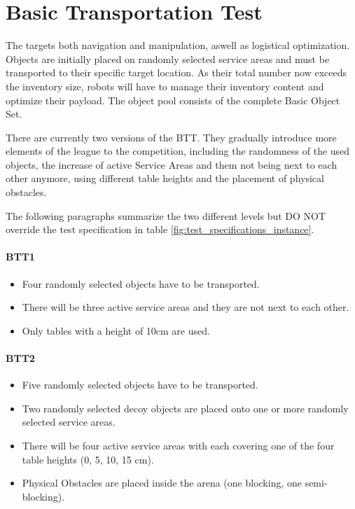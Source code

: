 
\section{Basic Transportation Test}
\label{sec:Basic Transportation Test}

The  targets both navigation and manipulation, aswell as logistical optimization. Objects are initially placed on randomly selected service areas and must be transported to their specific target location.
As their total number now exceeds the inventory size, robots will have to manage their inventory content and optimize their payload. The object pool consists of the complete Basic Object Set.

There are currently two versions of the BTT. 
They gradually introduce more elements of the league to the competition, including the randomness of the used objects, the increase of active Service Areas and them not being next to each other anymore, using different table heights and the placement of physical obstacles.

The following paragraphs summarize the two different levels but DO NOT override the test specification in table \ref{fig:test_specifications_instance}.

\paragraph{BTT1}
\begin{itemize}
\item Four randomly selected objects have to be transported.
\item There will be three active service areas and they are not next to each other.
\item Only tables with a height of 10cm are used. 
\end{itemize}

\paragraph{BTT2}
\begin{itemize}
\item Five randomly selected objects have to be transported.
\item Two randomly selected decoy objects are placed onto one or more randomly selected service areas.
\item There will be four active service areas with each covering one of the four table heights (0, 5, 10, 15 $\si{\centi\meter}$).
\item Physical Obstacles are placed inside the arena (one blocking, one semi-blocking).
\end{itemize}